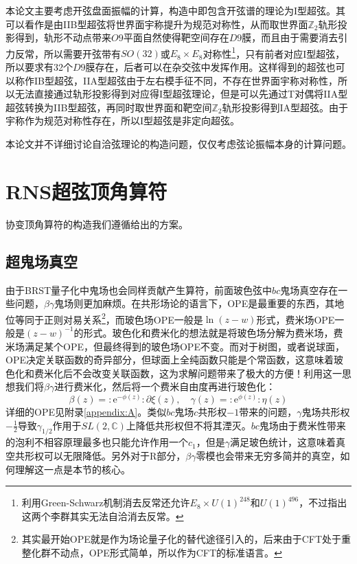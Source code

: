 本论文主要考虑开弦盘面振幅的计算，构造中即包含开弦谱的理论为I型超弦。其可以看作是由IIB型超弦将世界面宇称提升为规范对称性，从而取世界面$\mathbb{Z}_2$轨形投影得到，轨形不动点带来$O9$平面自然使得靶空间存在$D9$膜，而且由于需要消去引力反常，所以需要开弦带有$SO(32)$或$E_8\times E_8$对称性\footnote{利用Green-Schwarz机制消去反常还允许$E_8\times U(1)^{248}$和$U(1)^{496}$，不过\cite{PhysRevLett.105.071601}指出这两个李群其实无法自洽消去反常。}，只有前者对应I型超弦，所以要求有32个$D9$膜存在，后者可以在杂交弦中发挥作用。这样得到的超弦也可以称作IB型超弦，IIA型超弦由于左右模手征不同，不存在世界面宇称对称性，所以无法直接通过轨形投影得到对应得I型超弦理论，但是可以先通过T对偶将IIA型超弦转换为IIB型超弦，再同时取世界面和靶空间$\mathbb{Z}_2$轨形投影得到IA型超弦。由于宇称作为规范对称性存在，所以I型超弦是非定向超弦。

本论文并不详细讨论自洽弦理论的构造问题，仅仅考虑弦论振幅本身的计算问题。

\section{RNS超弦顶角算符}
协变顶角算符的构造我们遵循\cite{Friedan:1985ge,Knizhnik:1985ke}给出的方案。
\subsection{超鬼场真空}
由于BRST量子化中鬼场也会同样贡献产生算符，前面玻色弦中$bc$鬼场真空存在一些问题，$\beta\gamma$鬼场则更加麻烦。在共形场论的语言下，OPE是最重要的东西，其地位等同于正则对易关系\footnote{其实最开始OPE就是作为场论量子化的替代途径引入的，后来由于CFT处于重整化群不动点，OPE形式简单，所以作为CFT的标准语言。}，而玻色场OPE一般是$\ln(z-w)$形式，费米场OPE一般是$(z-w)^{-1}$的形式。玻色化和费米化的想法就是将玻色场分解为费米场，费米场满足某个OPE，但最终得到的玻色场OPE不变。而对于树图，或者说球面，OPE决定关联函数的奇异部分，但球面上全纯函数只能是个常函数，这意味着玻色化和费米化后不会改变关联函数，这为求解问题带来了极大的方便！利用这一思想我们将$\beta\gamma$进行费米化，然后将一个费米自由度再进行玻色化：
\begin{equation}
	\label{eq:3.19}
	\beta(z)=:\mathrm{e}^{-\phi(z)}:\partial\xi(z),\quad\gamma(z)=:\mathrm{e}^{\phi(z)}:\eta(z)
\end{equation}
详细的OPE见附录\ref{appendix:A}。类似$bc$鬼场$c$共形权$-1$带来的问题，$\gamma$鬼场共形权$-\frac12$导致$\gamma_{1/2}$作用于$SL(2,\mathbb{C})$上降低共形权但不将其湮灭。$bc$鬼场由于费米性带来的泡利不相容原理最多也只能允许作用一个$c_1$，但是$\gamma$满足玻色统计，这意味着真空共形权可以无限降低。另外对于R部分，$\beta\gamma$零模也会带来无穷多简并的真空，如何理解这一点是本节的核心。

